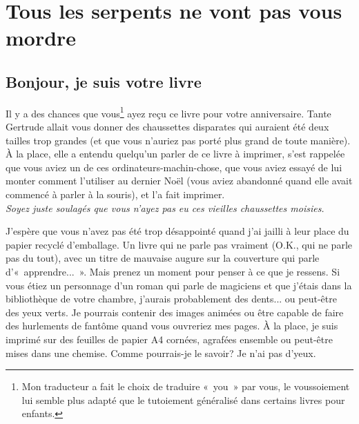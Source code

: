 


\mainmatter
\clearemptydoublepage
\chapter{Tous les serpents ne vont pas vous mor\-dre}
\section{Bonjour, je suis votre livre}
Il y a des chances que vous\footnote{Mon traducteur a fait le choix de traduire «~you~» par vous, le voussoiement lui semble plus adapté que le tutoiement généralisé dans certains livres pour enfants.} ayez reçu ce livre pour votre anniversaire. Tante Gertrude allait vous donner des chaussettes disparates qui auraient été deux tailles trop grandes (et que vous n'auriez pas porté plus grand de toute manière). À la place, elle a entendu quelqu'un parler de ce livre à imprimer, s'est rappelée que vous aviez un de ces ordinateurs-machin-chose, que vous aviez essayé de lui monter comment l'utiliser au dernier Noël (vous aviez abandonné quand elle avait commencé à parler à la souris), et l'a fait imprimer.
\\


\emph{Soyez juste soulagés que vous n'ayez pas eu ces vieilles chaussettes moisies.\\}


J'espère que vous n'avez pas été trop désappointé quand j'ai jailli à leur place du papier recyclé d'emballage.
Un livre qui ne parle pas vraiment (O.K., qui ne parle pas du tout), avec un titre de mauvaise augure sur la couverture 
qui parle d'«~apprendre...~». Mais prenez un moment pour penser à ce que je ressens. Si vous étiez un personnage d'un roman qui parle de magiciens et que j'étais dans la bibliothèque de votre chambre, j'aurais probablement des dents... ou peut-être des yeux verts. Je pourrais contenir des images animées ou être capable de faire des hurlements de fantôme quand vous ouvreriez mes pages. À la place, je suis imprimé sur des feuilles de papier A4 cornées, agrafées ensemble ou peut-être mises dans une chemise. Comme pourrais-je le savoir? Je n'ai pas d'yeux.\\


